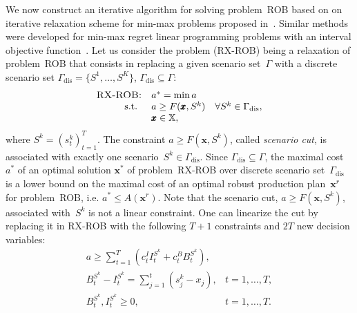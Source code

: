 \documentclass[11pt]{article}
\newcommand{\Xset}{\mathbb{X}}
\begin{document}
We now construct an iterative algorithm for solving problem~\textsc{ROB} based on
on iterative relaxation  scheme for min-max problems proposed in~\cite{SA80}.
Similar methods were developed for min-max regret linear programming problems
with an interval objective function~\cite{IS95,ML99}.
Let us consider the problem (\textsc{RX-ROB})
being a relaxation of  problem~\textsc{ROB}  that consists in 
replacing a given scenario set~$\Gamma$ with a discrete scenario set
$\Gamma_{\text{dis}}=\{S^1,\ldots,S^K\}$, $\Gamma_{\text{dis}}\subseteq \Gamma$:
\begin{equation}
 \begin{array}{rll}
  \textsc{RX-ROB:}&a^{*}=\min a&\\
  \text{s.t. }&a\geq F(\pmb{x},S^{k})&\forall S^k\in \Gamma_{\text{dis}},\\
  &\pmb{x}\in \Xset,&
 \end{array}
 \label{relrob}
\end{equation}
where $S^{k}=(s^{k}_t)_{t=1}^{T}$.
The constraint 
$a\geq F(\pmb{x},S^{k})$,
called \emph{scenario cut}, is associated with exactly one scenario~$S^k\in \Gamma_{\text{dis}}$.
Since $\Gamma_{\text{dis}}\subseteq \Gamma$, the maximal cost~$a^{*}$ of
an optimal solution $\pmb{x}^{*}$ of problem~\textsc{RX-ROB} 
over discrete scenario set~$\Gamma_{\text{dis}}$
is a lower bound on
the maximal cost of an optimal robust production plan~$\pmb{x}^{r}$ for
problem~\textsc{ROB}, i.e. $a^{*}\leq A(\pmb{x}^{r})$.
Note that the scenario cut, $a\geq F(\pmb{x},S^{k})$,
associated with~$S^{k}$
 is not a linear constraint. One can linearize the cut
by replacing it in \textsc{RX-ROB} with the following $T+1$ constraints 
and $2T$ new decision variables:
\[
 \begin{array}{ll}
a\geq \sum_{t=1}^{T}(c^I_t I^{S^{k}}_t+ c^B_t B^{S^{k}}_t),&\\
B^{S^{k}}_t- I^{S^{k}}_t=\sum_{j=1}^{t}(s^{k}_j-x_j),&t=1,\ldots,T, \\
         B^{S^{k}}_t,I^{S^{k}}_t\geq 0,&t=1,\ldots,T.
 \end{array}
\]
\end{document}

